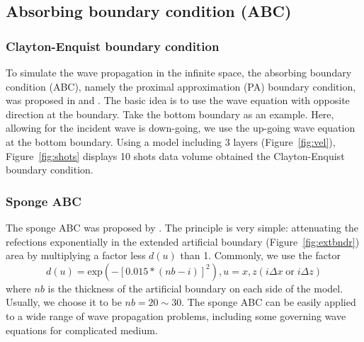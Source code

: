 \subsection{Absorbing boundary condition (ABC)}

\subsubsection{Clayton-Enquist boundary condition}

To simulate the wave propagation in the infinite space, the absorbing boundary condition (ABC), namely the proximal approximation (PA) boundary condition,  was proposed in \cite{clayton1977absorbing} and \cite{engquist1977absorbing}. The basic idea is to use the wave equation with opposite direction at the boundary. Take the bottom boundary as an example. Here, allowing for the incident wave is down-going, we use the up-going wave equation at the bottom boundary. Using a model including 3 layers (Figure~\ref{fig:vel}), Figure~\ref{fig:shots} displays 10 shots data volume obtained the Clayton-Enquist boundary condition.

% 
% 




\subsubsection{Sponge ABC}

The sponge ABC was proposed by \cite{cerjan1985nonreflecting}. The principle is very simple: attenuating the refections exponentially in the extended artificial boundary (Figure~\ref{fig:extbndr}) area by multiplying a factor less $d(u)$ than 1. Commonly, we use the factor
\begin{equation}
d(u)=\mathrm{exp}(-[0.015*(nb-i)]^2), u=x,z (i\Delta x \; \mathrm{or} \; i\Delta z)
\end{equation}
where $nb$ is the thickness of the artificial boundary on each side of the model. Usually, we choose it to be $nb=20 \sim30$.
The sponge ABC can be easily applied to a wide range of wave propagation problems, including some  governing wave equations for complicated medium. 

